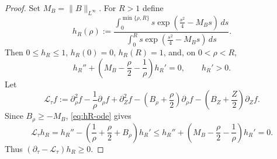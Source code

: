 \begin{proof}
Set \(M_B=\|B\|_{L^\infty}\).  For \(R>1\) define
\begin{equation}\label{eq:radial-barrier}
   h_R(\rho)
   :=
   \frac{\displaystyle\int_0^{\min\{\rho,R\}} s
      \exp\left(\frac{s^2}{4}-M_Bs\right)\,ds}
   {\displaystyle\int_0^R s
      \exp\left(\frac{s^2}{4}-M_Bs\right)\,ds} .
\end{equation}
Then \(0\le h_R\le1\), \(h_R(0)=0\), \(h_R(R)=1\), and, on
\(0<\rho<R\),
\begin{equation}\label{eq:hR-ode}
   h_R''+\left(M_B-\frac\rho2-\frac1\rho\right)h_R'=0,
   \qquad h_R'>0 .
\end{equation}
Let
\[
   \mathcal L_\tau f
   :=
   \partial_\rho^2f-\frac1\rho\partial_\rho f+\partial_Z^2f
   -\left(B_\rho+\frac\rho2\right)\partial_\rho f
   -\left(B_Z+\frac Z2\right)\partial_Z f .
\]
Since \(B_\rho\ge -M_B\), \eqref{eq:hR-ode} gives
\begin{equation}\label{eq:hR-superharmonic}
   \mathcal L_\tau h_R
   =h_R''-\left(\frac1\rho+\frac\rho2+B_\rho\right)h_R'
   \le
   h_R''+\left(M_B-\frac\rho2-\frac1\rho\right)h_R'
   =0 .
\end{equation}
Thus \((\partial_\tau-\mathcal L_\tau)h_R\ge0\).


\end{proof}
